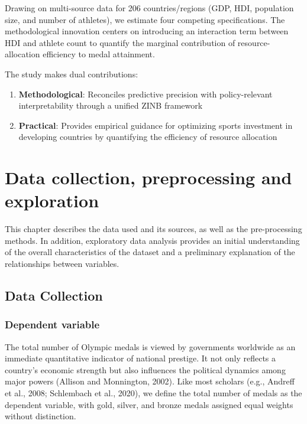 \documentclass[11pt,twoside]{article}
\numberwithin{Theorem}{section}
\numberwithin{Definition}{section}
\numberwithin{Lemma}{section}
\numberwithin{Algorithm}{section}
\numberwithin{equation}{section}
\begin{document}
Drawing on multi-source data for 206 countries/regions (GDP, HDI, population size, and number of athletes), we estimate four competing specifications. The methodological innovation centers on introducing an interaction term between HDI and athlete count to quantify the marginal contribution of resource-allocation efficiency to medal attainment.

The study makes dual contributions:
\begin{enumerate}
    \item \textbf{Methodological}: Reconciles predictive precision with policy-relevant interpretability through a unified ZINB framework
    \item \textbf{Practical}: Provides empirical guidance for optimizing sports investment in developing countries by quantifying the efficiency of resource allocation
\end{enumerate}

\section{Data collection, preprocessing and exploration}
This chapter describes the data used and its sources, as well as the pre-processing methods. In addition, exploratory data analysis provides an initial understanding of the overall characteristics of the dataset and a preliminary explanation of the relationships between variables.
\label{sec:background}

\subsection{Data Collection}
\subsubsection{Dependent variable}
The total number of Olympic medals is viewed by governments worldwide as an immediate quantitative indicator of national prestige. It not only reflects a country's economic strength but also influences the political dynamics among major powers (Allison and Monnington, 2002). Like most scholars (e.g., Andreff et al., 2008; Schlembach et al., 2020), we define the total number of medals as the dependent variable, with gold, silver, and bronze medals assigned equal weights without distinction.
\end{document}
